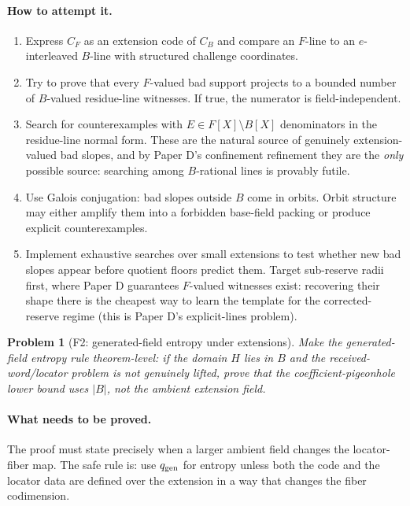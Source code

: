 \documentclass[11pt]{article}
\newtheorem{problem}[theorem]{Problem}
\theoremstyle{definition}
\theoremstyle{remark}
\newcommand{\qgen}{q_{\rm gen}}
\newcommand{\paperD}{Paper D}
\begin{document}
\paragraph{How to attempt it.}
\begin{enumerate}[leftmargin=2.2em]
\item Express $C_F$ as an extension code of $C_B$ and compare an $F$-line to an $e$-interleaved $B$-line with structured challenge coordinates.
\item Try to prove that every $F$-valued bad support projects to a bounded number of $B$-valued residue-line witnesses.  If true, the numerator is field-independent.
\item Search for counterexamples with $E\in F[X]\setminus B[X]$ denominators in the residue-line normal form.  These are the natural source of genuinely extension-valued bad slopes, and by \paperD's confinement refinement they are the \emph{only} possible source: searching among $B$-rational lines is provably futile.
\item Use Galois conjugation: bad slopes outside $B$ come in orbits.  Orbit structure may either amplify them into a forbidden base-field packing or produce explicit counterexamples.
\item Implement exhaustive searches over small extensions to test whether new bad slopes appear before quotient floors predict them.  Target sub-reserve radii first, where \paperD{} guarantees $F$-valued witnesses exist: recovering their shape there is the cheapest way to learn the template for the corrected-reserve regime (this is \paperD's explicit-lines problem).
\end{enumerate}

\begin{problem}[F2: generated-field entropy under extensions]
\label{prob:F2}
Make the generated-field entropy rule theorem-level: if the domain $H$ lies in $B$ and the received-word/locator problem is not genuinely lifted, prove that the coefficient-pigeonhole lower bound uses $|B|$, not the ambient extension field.
\end{problem}

\paragraph{What needs to be proved.}  The proof must state precisely when a larger ambient field changes the locator-fiber map.  The safe rule is: use $\qgen$ for entropy unless both the code and the locator data are defined over the extension in a way that changes the fiber codimension.
\end{document}
